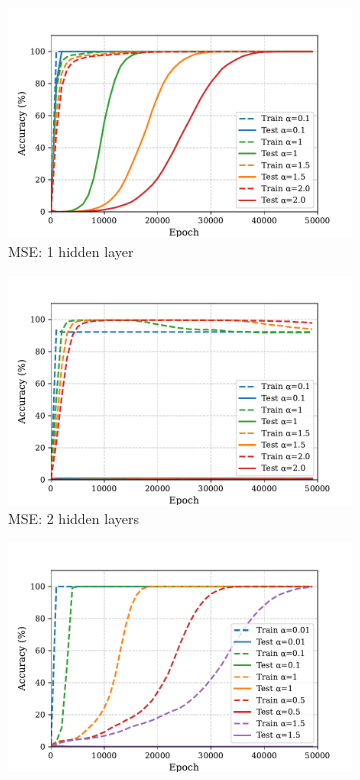\begin{figure}[t]
\centering
\begin{subfigure}{.33\textwidth}
  \centering
  \includegraphics[width=\linewidth]{grokking_iclr_arxiv/figures/one_layer_MSE_alpha_sweep.pdf}
  \caption{MSE: 1 hidden layer}
\end{subfigure}%
\hfill
\begin{subfigure}{.33\textwidth}
  \centering
  \includegraphics[width=\linewidth]{grokking_iclr_arxiv/figures/two_layer_MSE_alpha_sweep.pdf}
  \caption{MSE: 2 hidden layers}
\end{subfigure}%
\hfill
\begin{subfigure}{.33\textwidth}
  \centering
  \includegraphics[width=\linewidth]{grokking_iclr_arxiv/figures/two_layer_cross_entropy_alpha_sweep.pdf}

\end{subfigure}
\end{figure}
